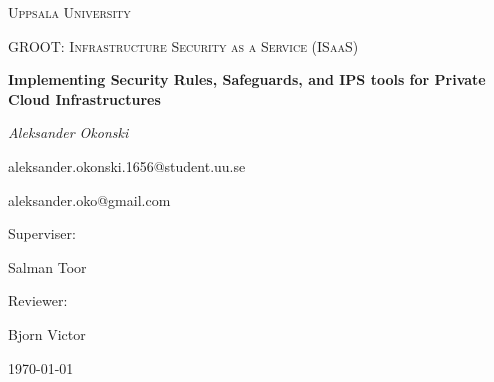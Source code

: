 \documentclass[12pt,a4paper]{report}
\begin{document}
\begin{titlepage}
    \centering
    {\scshape\Large Uppsala University \par}
    \vspace{1cm}
    {\scshape\Huge GROOT: Infrastructure Security as a Service (ISaaS)\par}
    \vspace{1.5cm}
    {\Large\bfseries Implementing Security Rules, Safeguards, and IPS tools for Private Cloud Infrastructures\par}
    \vspace{2cm}
    {\Large\itshape Aleksander Okonski\par}
    \vspace{1cm}
    aleksander.okonski.1656@student.uu.se\par
    aleksander.oko@gmail.com

    \vfill
    Superviser:\par
    Salman Toor\par
    \vspace{1cm}
    Reviewer:\par
    Bjorn Victor


    \vfill

    {\large \today\par}
\end{titlepage}
\end{document}
